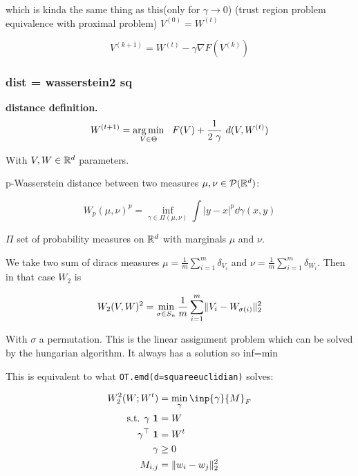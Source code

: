 which is kinda the same thing as this(only for $\gamma \rightarrow 0$) (trust region problem equivalence with proximal problem) $V^{(0)} = W^{(t)}$

\begin{equation}
	V^{(k+1)} = W^{(t)} - \gamma \nabla F(V^{(k)})
\end{equation}

\subsubsection{dist = wasserstein2 sq}

\textbf{distance definition.}
\begin{equation}
	W^{(t+1)} = \operatorname*{arg\,min}_{V \in \Theta} \ \  F(V) + \frac{1}{2 ~ \gamma} ~ d(V, W^{(t)})
\end{equation}


With $V, W \in \mathbb{R}^d$ parameters.

p-Wasserstein distance between two measures $\mu, \nu \in \mathcal{P}(\mathbb{R}^d)$: 

\begin{equation}
	W_p(\mu, \nu)^p = \inf_{\gamma \in \Pi(\mu, \nu)} \int |y - x|^p \dd \gamma(x, y)
\end{equation}

$\Pi$ set of probability measures on $\mathbb{R}^d$ with marginals $\mu$ and $\nu$.

We take two sum of diracs measures $\mu = \frac{1}{m} \sum_{i=1}^{m} \delta_{V_i}$ and $\nu = \frac{1}{m} \sum_{i=1}^{m} \delta_{W_i}$. Then in that case $W_2$ is

\begin{equation}
	W_2(V, W)^2 = \min_{\sigma \in S_n} \frac{1}{m} \sum_{i=1}^{m} \lVert V_i - W_{\sigma(i)}\rVert^2_2
\end{equation}

With $\sigma$ a permutation. This is the linear assignment problem which can be solved by the hungarian algorithm. It always has a solution so inf=min

This is equivalent to what \texttt{OT.emd(d=squareeuclidian)} solves:

\begin{align}
	W_2^2(W; W^t) &= \min_{\gamma} \inp{\gamma}{M}_F \\
	\text{s.t.  } \gamma ~ \mathbf{1} &= W \\
	\gamma^\top ~ \mathbf{1} &= W^t \\
	\gamma &\geq 0 \\
	M_{i, j} &= \lVert w_i - w_j \rVert^2_2
\end{align}

